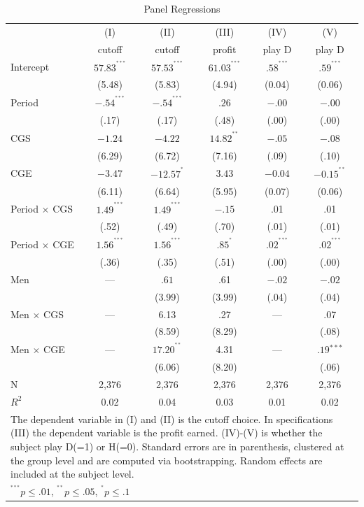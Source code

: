 \documentclass[12pt, letterpaper]{article}
\theoremstyle{plain}
\begin{document}
\begin{table}[ht]
\centering
\caption{Panel Regressions}
\footnotesize
\begin{tabular}{lccccc}

  & (I) & (II) & (III)  & (IV) & (V)\\
&  cutoff & cutoff  & profit & play D & play D \\
    \hline
Intercept & $57.83^{^{***}}$ &  $ 57.53^{^{***}}$ &  $61.03^{^{***}}$ & $.58^{^{***}}$& $.59^{^{***}}$\\
& (5.48) & (5.83)  & (4.94) & (0.04) & (0.06)\\
Period & $-.54^{^{***}}$ & $-.54^{^{***}}$  & $.26$ &  $ -.00$ & $ -.00$\\
& (.17)&  (.17) & (.48) & (.00) & (.00) \\
CGS & $-1.24$ &  $-4.22$  &  $14.82^{^{**}}$ &  $-.05$ & $-.08$\\
& (6.29) & (6.72) & (7.16) & (.09) & (.10)\\
CGE & $-3.47$ &  $-12.57^{^{*}}$   &  $3.43$ &  $-0.04$ & $-0.15^{^{**}}$\\
& (6.11) & (6.64)  & (5.95) & (0.07) & (0.06)\\
Period $\times$ CGS & $1.49^{^{***}}$& $ 1.49^{^{***}}$ & $-.15$ & .01 & .01 \\
& (.52) & (.49) & (.70) & (.01) & (.01) \\
Period $\times$ CGE & $1.56^{^{***}}$& $1.56^{^{***}}$ &$.85^{^{*}}$ & $.02^{^{***}}$ & $.02^{^{***}}$ \\
& (.36) & (.35)  & (.51) & (.00) &  (.00)\\
Men & --- &  $.61$ & .61  & $-.02$ &  $-.02$ \\
&  & (3.99) & (3.99)  & (.04) & (.04)\\
Men $\times$ CGS & ---&  6.13 &  .27 & --- & .07\\
& & (8.59) & (8.29)&  & (.08)\\
Men $\times$ CGE & ---& $17.20^{^{**}}$ & 4.31 & --- & $.19{^{***}}$\\
& & (6.06)& (8.20)&& (.06)\\

\hline
N & 2,376 & 2,376 & 2,376 & 2,376  & 2,376  \\ 
$R^2$ & 0.02 & 0.04  & 0.03 & 0.01 & 0.02\\
\hline
\hline
 \multicolumn{6}{p{.65\textwidth}}{\scriptsize{The dependent variable in (I) and (II) is the cutoff choice. In specifications (III) the dependent variable is the profit earned. (IV)-(V) is whether the subject play D(=1) or H(=0). Standard errors are in parenthesis, clustered at the group level and are computed via bootstrapping. Random effects are included at the subject level. }}\\ 
 \multicolumn{4}{p{0.4\textwidth}}{\scriptsize{ $^{^{***}}p\leq.01$,
    $^{^{**}}p\leq.05$, $^{^{*}}p\leq.1$}} \\
\end{tabular}
\label{table:ols_all}
\end{table}
\end{document}
